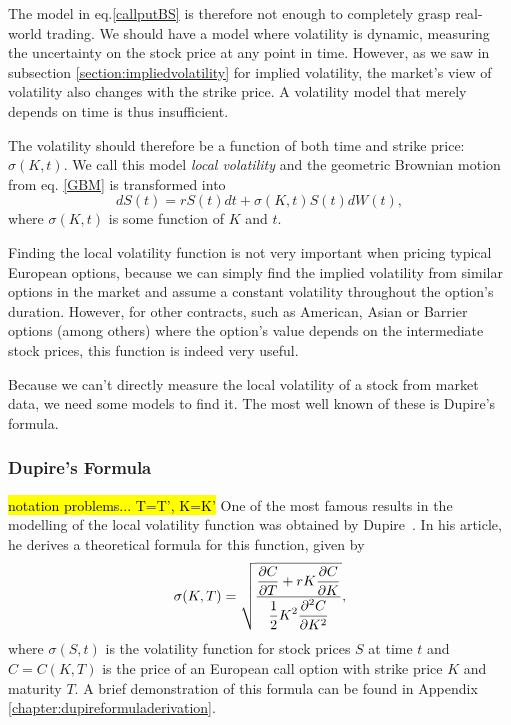The model in eq.\eqref{callputBS} is therefore not enough to completely grasp real-world trading. We should have a model where volatility is dynamic, measuring the uncertainty on the stock price at any point in time.
However, as we saw in subsection \ref{section:impliedvolatility} for implied volatility, the market's view of volatility also changes with the strike price. A volatility model that merely depends on time is thus insufficient.

The volatility should therefore be a function of both time and strike price: $\sigma(K,t)$. We call this model \emph{local volatility} and the geometric Brownian motion from eq. \ref{GBM} is transformed into
\begin{equation}\label{GBM2}
dS(t)=rS(t)dt+\sigma(K,t)S(t)dW(t),
\end{equation}
\noindent where $\sigma(K,t)$ is some function of $K$ and $t$.


Finding the local volatility function is not very important when pricing typical European options, because we can simply find the implied volatility from similar options in the market and assume a constant volatility throughout the option's duration.
However, for other contracts, such as American, Asian or Barrier options (among others) where the option's value depends on the intermediate stock prices, this function is indeed very useful.

Because we can't directly measure the local volatility of a stock from market data, we need some models to find it. The most well known of these is Dupire's formula.

\subsubsection{Dupire's Formula}
\label{subsubsection:Dupire}
\hl{notation problems... T=T', K=K'}
One of the most famous results in the modelling of the local volatility function was obtained by Dupire~\cite{Dupire}. In his article, he derives a theoretical formula for this function, given by
\begin{equation}\label{dupire}
\sigma(K,T)=\sqrt{\frac{\displaystyle\pdv{C}{T}+rK\pdv{C}{K}}{\displaystyle\frac{1}{2}K^2\pdv{^2C}{K^2}}},
\end{equation}
\noindent where $\sigma(S,t)$ is the volatility function for stock prices $S$ at time $t$ and $C=C(K,T)$ is the price of an European call option with strike price $K$ and maturity $T$.
A brief demonstration of this formula can be found in Appendix \ref{chapter:dupireformuladerivation}.


